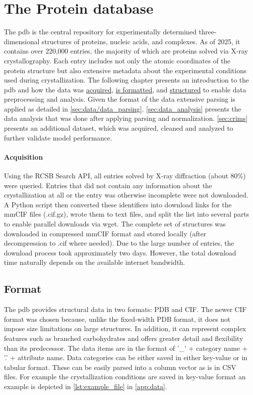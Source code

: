 \section{The Protein database}\label{sec:protein_database}
The \gls{pdb} is the central repository for experimentally determined three-dimensional structures of proteins, nucleic acids, and complexes. As of 2025, it contains over 220{,}000 entries, the majority of which are proteins solved via X-ray crystallography. Each entry includes not only the atomic coordinates of the protein structure but also extensive metadata about the experimental conditions used during crystallization.
The following chapter presents an introduction to the \gls{pdb} and how the data was \hyperref[sec:protein_database/acquisition]{acquired}, \hyperref[sec:protein_database/format]{is formatted}, and \hyperref[sec:protein_database/structure]{structured} to enable data preprocessing and analysis. Given the format of the data extensive parsing is applied as detailed in \autoref{sec:data/data_parsing}. \autoref{sec:data_analysis} presents the data analysis that was done after applying parsing and normalization. 
\autoref{sec:crims} presents an additional dataset, which was acquired, cleaned and analyzed to further validate model performance. 

\paragraph{Acquisition}\label{sec:protein_database/acquisition}
Using the RCSB Search API, all entries solved by X-ray diffraction (about 80\%) were queried. Entries that did not contain any information about the crystallization at all or the entry was otherwise incomplete were not downloaded. A Python script then converted these identifiers into download links for the mmCIF files (.cif.gz), wrote them to text files, and split the list into several parts to enable parallel downloads via wget. The complete set of structures was downloaded in compressed mmCIF format and stored locally (after decompression to .cif where needed). Due to the large number of entries, the download process took approximately two days. However, the total download time naturally depends on the available internet bandwidth.

\subsection*{Format}\label{sec:protein_database/format}
The \gls{pdb} provides structural data in two formats: PDB and CIF. The newer CIF format was chosen because, unlike the fixed-width PDB format, it does not impose size limitations on large structures. In addition, it can represent complex features such as branched carbohydrates and offers greater detail and flexibility than its predecessor.
The data items are in the format of '\_' + category name + '.' + attribute name. Data categories can be either saved in either key-value or in tabular format. These can be easily parsed into a column vector as is in CSV files. For example the crystallization conditions are saved in key-value format an example is depicted in \autoref{lst:example_file} in \autoref{app:data}.



